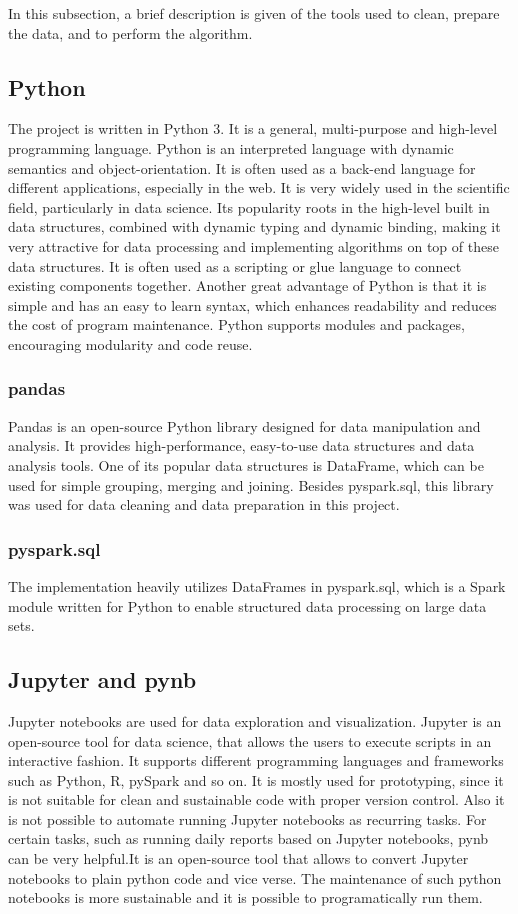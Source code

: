 In this subsection, a brief description is given of the tools used to clean, prepare the data, and to perform the algorithm.

\subsection{Python}
The project is written in Python 3. It is a general, multi-purpose and high-level programming language. Python is an interpreted language with dynamic semantics and object-orientation. It is often used as a back-end language for different applications, especially in the web. It is very widely used in the scientific field, particularly in data science. Its popularity roots in the high-level built in data structures, combined with dynamic typing and dynamic binding, making it very attractive for data processing and implementing algorithms on top of these data structures. 
It is often used as a scripting or glue language to connect existing components together. Another great advantage of Python is that it is simple and has an easy to learn syntax, which enhances readability and reduces the cost of program maintenance. Python supports modules and packages, encouraging modularity and code reuse. \cite{python}

\subsubsection{pandas}
Pandas is an open-source Python library designed for data manipulation and analysis. It provides high-performance, easy-to-use data structures and data analysis tools. One of its popular data structures is DataFrame, which can be used for simple grouping, merging and joining. Besides pyspark.sql, this library was used for data cleaning and data preparation in this project.

\subsubsection{pyspark.sql}
The implementation heavily utilizes DataFrames in pyspark.sql, which is a Spark module written for Python to enable structured data processing on large data sets. 

\subsection{Jupyter and pynb}
Jupyter notebooks are used for data exploration and visualization. Jupyter is an open-source tool for data science, that allows the users to execute scripts in an interactive fashion. It supports different programming languages and frameworks such as Python, R, pySpark and so on. It is mostly used for prototyping, since it is not suitable for clean and sustainable code with proper version control. Also it is not possible to automate running Jupyter notebooks as recurring tasks. 
For certain tasks, such as running daily reports based on Jupyter notebooks, pynb can be very helpful.It is an open-source tool that allows to convert Jupyter notebooks to plain python code and vice verse. The maintenance of such python notebooks is more sustainable and it is possible to programatically run them. \cite{pynb}